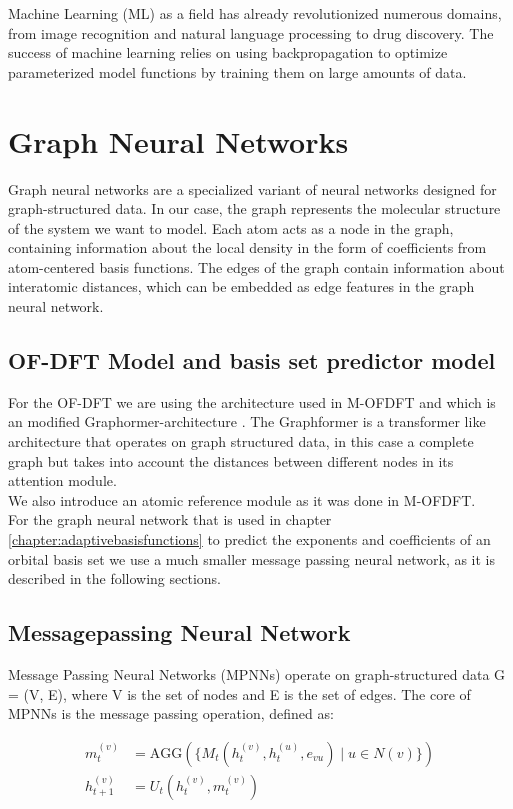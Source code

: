 Machine Learning (ML) as a field has already revolutionized numerous domains, from image recognition and natural language processing to drug discovery. The success of machine learning relies on using backpropagation to optimize parameterized model functions by training them on large amounts of data.

\section{Graph Neural Networks}
Graph neural networks are a specialized variant of neural networks designed for graph-structured data. In our case, the graph represents the molecular structure of the system we want to model. Each atom acts as a node in the graph, containing information about the local density in the form of coefficients from atom-centered basis functions. The edges of the graph contain information about interatomic distances, which can be embedded as edge features in the graph neural network.
\subsection{OF-DFT Model and basis set predictor model}
For the OF-DFT we are using the architecture used in M-OFDFT\cite{zhang_m-ofdft_2023} and which is an modified Graphormer-architecture \cite{ying2021transformers}. The Graphformer is a transformer like architecture that operates on graph structured data, in this case a complete graph but takes into account the distances between different nodes in its attention module.\\
We also introduce an atomic reference module as it was done in M-OFDFT.\\
For the graph neural network that is used in chapter
\ref{chapter:adaptivebasisfunctions} to predict the exponents and coefficients of an orbital basis set we use a much smaller message passing neural network, as it is described in the following sections.

\subsection{Messagepassing Neural Network}
Message Passing Neural Networks (MPNNs) operate on graph-structured data G = (V, E), where V is the set of nodes and E is the set of edges. The core of MPNNs is the message passing operation, defined as:

\begin{align}
m_t^{(v)} &= \text{AGG}\left(\{M_t(h_t^{(v)}, h_t^{(u)}, e_{vu}) \mid u \in N(v)\}\right) \\
h_{t+1}^{(v)} &= U_t(h_t^{(v)}, m_t^{(v)})
\end{align} 
    

